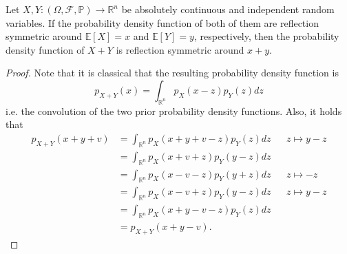 \documentclass[10pt,a4paper]{amsart}
\begin{document}
\begin{lemma}
\label{lem:convsymm}
Let $X,Y:(\Omega,\mathcal{F},\mathbb{P})\rightarrow \mathbb{R}^n$ be absolutely continuous and independent random variables. If the probability density function of both of them are reflection symmetric around $\mathbb{E}[X]=x$ and $\mathbb{E}[Y]=y$, respectively, then the probability density function of $X+Y$ is reflection symmetric around $x+y$.
\end{lemma}

\begin{proof}
Note that it is classical that the resulting probability density function is
\[
p_{X+Y}(x) = \int_{\mathbb{R}^n} p_X(x-z)p_Y(z) dz
\]
i.e. the convolution of the two prior probability density functions. Also, it holds that
\[
\begin{aligned}
p_{X+Y}(x+y+v) &= \int_{\mathbb{R}^n} p_X(x+y+v-z) p_Y(z) dz&& z\mapsto y-z\\
&= \int_{\mathbb{R}^n} p_X(x+v+z) p_Y(y-z) dz\\
&= \int_{\mathbb{R}^n} p_X(x-v-z) p_Y(y+z) dz&& z\mapsto -z\\
&= \int_{\mathbb{R}^n} p_X(x-v+z) p_Y(y-z) dz&& z\mapsto y-z\\
&= \int_{\mathbb{R}^n} p_X(x+y-v-z) p_Y(z) dz\\
&= p_{X+Y}(x+y-v).
\end{aligned}
\]
\end{proof}
\end{document}
